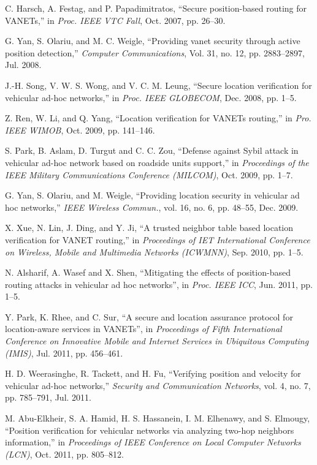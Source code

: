 \documentclass[journal]{IEEEtran}
\begin{document}
\begin{thebibliography}{1}
 C. Harsch, A. Festag, and P. Papadimitratos, ``Secure position-based routing for VANETs,'' in \emph{Proc. IEEE VTC Fall}, Oct. 2007, pp. 26--30.

 G. Yan, S. Olariu, and M. C. Weigle, ``Providing vanet security through active position detection,'' \emph{Computer Communications}, Vol. 31, no. 12, pp. 2883--2897,  Jul. 2008.

 J.-H. Song, V. W. S. Wong, and V. C. M. Leung, ``Secure location verification for vehicular ad-hoc networks,'' in \textit{Proc. IEEE  GLOBECOM}, Dec. 2008, pp. 1--5.

 Z. Ren, W. Li, and Q. Yang, ``Location verification for VANETs routing,'' in \textit{Pro. IEEE WIMOB}, Oct. 2009, pp. 141--146.

 S. Park, B. Aslam, D. Turgut and C. C. Zou, ``Defense against Sybil attack in vehicular ad-hoc network based on roadside units support,'' in \emph{Proceedings of the IEEE Military Communications Conference (MILCOM)}, Oct. 2009, pp. 1--7.

 G. Yan, S. Olariu, and M. Weigle, ``Providing location security in vehicular ad hoc networks,'' \textit{IEEE Wireless Commun.}, vol. 16, no. 6, pp. 48--55, Dec. 2009.

 X. Xue, N. Lin, J. Ding, and Y. Ji, ``A trusted neighbor table based location verification for VANET routing,'' in \emph{Proceedings of IET International Conference on Wireless, Mobile and Multimedia Networks (ICWMNN)}, Sep. 2010, pp. 1--5.

 N. Alsharif, A. Wasef and X. Shen, ``Mitigating the effects of position-based routing attacks in vehicular ad hoc networks'', in \textit{Proc. IEEE ICC}, Jun. 2011, pp. 1--5.

 Y. Park, K. Rhee, and C. Sur, ``A secure and location assurance protocol for location-aware services in VANETs'', in \emph{Proceedings of Fifth International Conference on Innovative Mobile and Internet Services in Ubiquitous Computing (IMIS)}, Jul. 2011, pp. 456--461.

 H. D. Weerasinghe, R. Tackett, and H. Fu, ``Verifying position and velocity for vehicular ad-hoc networks,'' \emph{Security and Communication Networks}, vol. 4, no. 7, pp. 785--791, Jul. 2011.

 M. Abu-Elkheir, S. A. Hamid, H. S. Hassanein, I. M. Elhenawy, and S. Elmougy, ``Position verification for vehicular networks via analyzing two-hop neighbors information,'' in \emph{Proceedings of IEEE Conference on Local Computer Networks (LCN)}, Oct. 2011, pp. 805--812.


\end{thebibliography}
\end{document}
